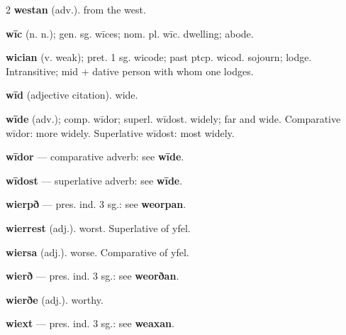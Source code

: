 \begin{multicols*}{2}
\textbf{westan} (adv.). from the west.\par
\textbf{wīc} (n. n.); gen. sg. wīces; nom. pl. wīc. dwelling; abode.\par
\textbf{wician} (v. weak); pret. 1 sg. wicode; past ptcp. wicod. sojourn; lodge. Intransitive; mid + dative person with whom one lodges.\par
\textbf{wīd} (adjective citation). wide.\par
\textbf{wīde} (adv.); comp. wīdor; superl. wīdost. widely; far and wide. Comparative wīdor: more widely. Superlative wīdost: most widely.\par
\textbf{wīdor} — comparative adverb: see \textbf{wīde}.\par
\textbf{wīdost} — superlative adverb: see \textbf{wīde}.\par
\textbf{wierpð} — pres. ind. 3 sg.: see \textbf{weorpan}.\par
\textbf{wierrest} (adj.). worst. Superlative of yfel.\par
\textbf{wiersa} (adj.). worse. Comparative of yfel.\par
\textbf{wierð} — pres. ind. 3 sg.: see \textbf{weorðan}.\par
\textbf{wierðe} (adj.). worthy.\par
\textbf{wiext} — pres. ind. 3 sg.: see \textbf{weaxan}.\par

\end{multicols*}
